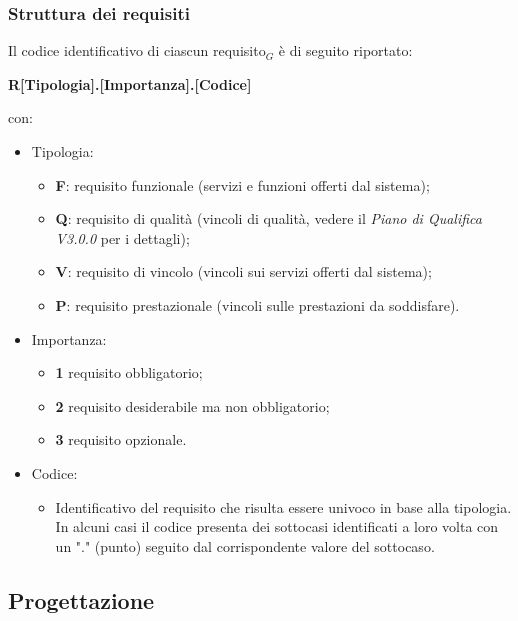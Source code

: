     \subsubsection{Struttura dei requisiti}
      Il codice identificativo di ciascun requisito$_G$ è di seguito riportato:
      \begin{center}
        \textbf{R[Tipologia].[Importanza].[Codice]}\\
      \end{center}
      con:
      \begin{itemize}
        \item Tipologia:
        \begin{itemize}
          \item \textbf{F}: requisito funzionale (servizi e funzioni offerti dal sistema);
          \item \textbf{Q}: requisito di qualità (vincoli di qualità, vedere il \textit{Piano di Qualifica V3.0.0} per i dettagli);
          \item \textbf{V}: requisito di vincolo (vincoli sui servizi offerti dal sistema);
          \item \textbf{P}: requisito prestazionale (vincoli sulle prestazioni da soddisfare).
        \end{itemize}

        \item Importanza:
        \begin{itemize}
          \item \textbf{1} requisito obbligatorio;
          \item \textbf{2} requisito desiderabile ma non obbligatorio;
          \item \textbf{3} requisito opzionale.
        \end{itemize}

        \item Codice:
        \begin{itemize}
          \item Identificativo del requisito che risulta essere univoco in base alla tipologia. In alcuni casi il codice presenta dei sottocasi identificati a loro volta con un "." (punto) seguito dal corrispondente valore del sottocaso.
        \end{itemize}

      \end{itemize}

  \subsection{Progettazione}
